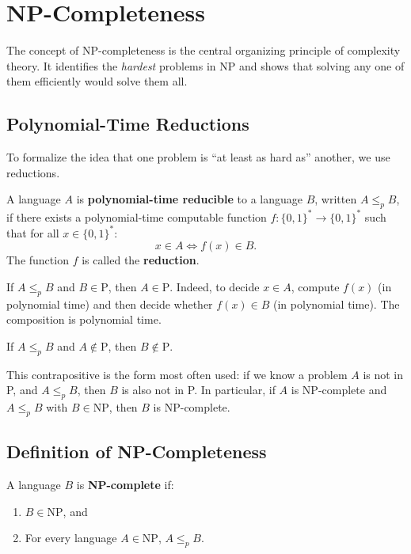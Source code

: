 \section{NP-Completeness}

The concept of NP-completeness is the central organizing principle of complexity theory. It identifies the \emph{hardest} problems in NP and shows that solving any one of them efficiently would solve them all.

\subsection{Polynomial-Time Reductions}

To formalize the idea that one problem is ``at least as hard as'' another, we use reductions.

\begin{definition}
A language $A$ is \textbf{polynomial-time reducible} to a language $B$, written $A \leq_p B$, if there exists a polynomial-time computable function $f: \{0,1\}^* \to \{0,1\}^*$ such that for all $x \in \{0,1\}^*$:
\[
x \in A \iff f(x) \in B.
\]
The function $f$ is called the \textbf{reduction}.
\end{definition}

\begin{remark}
If $A \leq_p B$ and $B \in \text{P}$, then $A \in \text{P}$. Indeed, to decide $x \in A$, compute $f(x)$ (in polynomial time) and then decide whether $f(x) \in B$ (in polynomial time). The composition is polynomial time.
\end{remark}

\begin{corollary}
If $A \leq_p B$ and $A \notin \text{P}$, then $B \notin \text{P}$.
\end{corollary}

This contrapositive is the form most often used: if we know a problem $A$ is not in P, and $A \leq_p B$, then $B$ is also not in P. In particular, if $A$ is NP-complete and $A \leq_p B$ with $B \in \text{NP}$, then $B$ is NP-complete.

\subsection{Definition of NP-Completeness}

\begin{definition}[NP-complete]
A language $B$ is \textbf{NP-complete} if:
\begin{enumerate}
  \item $B \in \text{NP}$, and
  \item For every language $A \in \text{NP}$, $A \leq_p B$.
\end{enumerate}
\end{definition}


